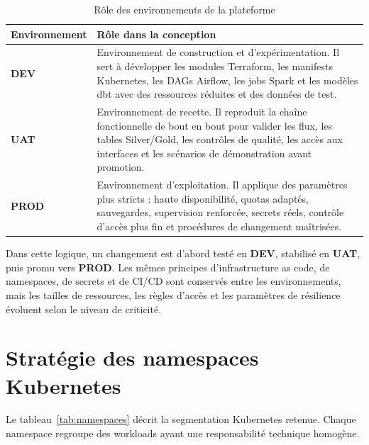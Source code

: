 \begin{table}[H]
\centering
\caption{Rôle des environnements de la plateforme}
\label{tab:environnements}
\small
\begin{tabular}{@{}p{}p{}@{}}
\toprule
\textbf{Environnement} & \textbf{Rôle dans la conception} \\
\midrule
\textbf{DEV} & Environnement de construction et d'expérimentation. Il sert à développer les modules Terraform, les manifests Kubernetes, les DAGs Airflow, les jobs Spark et les modèles dbt avec des ressources réduites et des données de test. \\
\textbf{UAT} & Environnement de recette. Il reproduit la chaîne fonctionnelle de bout en bout pour valider les flux, les tables Silver/Gold, les contrôles de qualité, les accès aux interfaces et les scénarios de démonstration avant promotion. \\
\textbf{PROD} & Environnement d'exploitation. Il applique des paramètres plus stricts : haute disponibilité, quotas adaptés, sauvegardes, supervision renforcée, secrets réels, contrôle d'accès plus fin et procédures de changement maîtrisées. \\
\bottomrule
\end{tabular}
\end{table}

Dans cette logique, un changement est d'abord testé en \textbf{DEV}, stabilisé en \textbf{UAT}, puis promu vers \textbf{PROD}. Les mêmes principes d'infrastructure as code, de namespaces, de secrets et de CI/CD sont conservés entre les environnements, mais les tailles de ressources, les règles d'accès et les paramètres de résilience évoluent selon le niveau de criticité.

\section{Stratégie des namespaces Kubernetes}

Le tableau~\ref{tab:namespaces} décrit la segmentation Kubernetes retenue. Chaque namespace regroupe des workloads ayant une responsabilité technique homogène.


